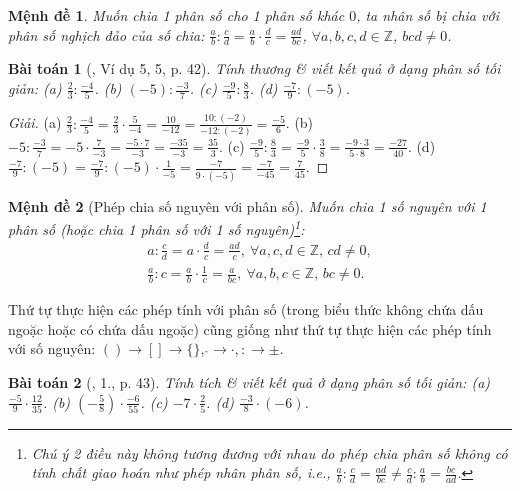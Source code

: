 \documentclass{article}
\newtheorem{baitoan}{Bài toán}
\newtheorem{menhde}{Mệnh đề}
\begin{document}
\begin{menhde}
	Muốn chia 1 phân số cho 1 phân số khác $0$, ta nhân số bị chia với phân số nghịch đảo của số chia: $\frac{a}{b}:\frac{c}{d} = \frac{a}{b}\cdot\frac{d}{c} = \frac{ad}{bc}$, $\forall a,b,c,d\in\mathbb{Z}$, $bcd\ne0$.
\end{menhde}

\begin{baitoan}[\cite{SGK_Toan_6_Canh_Dieu_tap_2}, Ví dụ 5, 5, p. 42]
	Tính thương \& viết kết quả ở dạng phân số tối giản: (a) $\frac{2}{3}:\frac{-4}{5}$. (b) $(-5):\frac{-3}{7}$. (c) $\frac{-9}{5}:\frac{8}{3}$. (d) $\frac{-7}{9}:(-5)$.
\end{baitoan}

\begin{proof}[Giải]
	(a) $\frac{2}{3}:\frac{-4}{5} = \frac{2}{3}\cdot\frac{5}{-4} = \frac{10}{-12} = \frac{10:(-2)}{-12:(-2)} = \frac{-5}{6}$. (b) $-5:\frac{-3}{7} =  -5\cdot\frac{7}{-3} = \frac{-5\cdot7}{-3} = \frac{-35}{-3} = \frac{35}{3}$. (c) $\frac{-9}{5}:\frac{8}{3} = \frac{-9}{5}\cdot\frac{3}{8} = \frac{-9\cdot3}{5\cdot8} = \frac{-27}{40}$. (d) $\frac{-7}{9}:(-5) = \frac{-7}{9}:(-5)\cdot\frac{1}{-5} = \frac{-7}{9\cdot(-5)} = \frac{-7}{-45} = \frac{7}{45}$.
\end{proof}

\begin{menhde}[Phép chia số nguyên với phân số]
	Muốn chia 1 số nguyên với 1 phân số (hoặc chia 1 phân số với 1 số nguyên)\footnote{Chú ý 2 điều này không tương đương với nhau do phép chia phân số không có tính chất giao hoán như phép nhân phân số, i.e., $\frac{a}{b}:\frac{c}{d} = \frac{ad}{bc}\ne\frac{c}{d}:\frac{a}{b} = \frac{bc}{ad}$.}:
	\begin{align*}
		a:\frac{c}{d} = a\cdot\frac{d}{c} = \frac{ad}{c},\ \forall a,c,d\in\mathbb{Z},\,cd\ne0,\\
		\frac{a}{b}:c = \frac{a}{b}\cdot\frac{1}{c} = \frac{a}{bc},\ \forall a,b,c\in\mathbb{Z},\,bc\ne0.
	\end{align*}
\end{menhde}
Thứ tự thực hiện các phép tính với phân số (trong biểu thức không chứa dấu ngoặc hoặc có chứa dấu ngoặc) cũng giống như thứ tự thực hiện các phép tính với số nguyên: $()\to[]\to\{\}$, $\widehat{}\to\cdot,:\to\pm$.

\begin{baitoan}[\cite{SGK_Toan_6_Canh_Dieu_tap_2}, 1., p. 43]
	Tính tích \& viết kết quả ở dạng phân số tối giản: (a) $\frac{-5}{9}\cdot\frac{12}{35}$. (b) $\left(-\frac{5}{8}\right)\cdot\frac{-6}{55}$. (c) $-7\cdot\frac{2}{5}$. (d) $\frac{-3}{8}\cdot(-6)$.
\end{baitoan}
\end{document}
